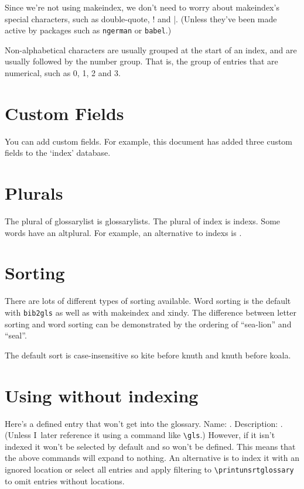 \documentclass{book}
\newcommand*{\appname}[1]{\texttt{#1}}
\begin{document}
Since we're not using \gls{makeindex}, we don't need to worry about
\gls{makeindex}'s special characters, such as \gls{double-quote}, \gls{!} and
\gls{|}. (Unless they've been made active by packages such as
\texttt{ngerman} or \texttt{babel}.)

Non-alphabetical characters are usually grouped at the start of an
index, and are usually followed by the number group. That is, the
group of entries that are numerical, such as \gls{0}, \gls{1},
\gls{2} and \gls{3}.

\section{Custom Fields}

You can add custom fields. For example, this document has added
three custom fields to the `index' database.

\section{Plurals}

The \gls{plural} of \gls{glossarylist} is
\glspl{glossarylist}. The \gls{plural} of \gls{index} is
\glspl{index}. Some words have an \gls{altplural}. For example,
an alternative to \glspl{index} is 
.%

\section{Sorting}

There are lots of different types of sorting available. 
Word sorting is the default with \appname{bib2gls} as well as with
\gls{makeindex} and \gls{xindy}.
The difference between letter sorting and word sorting can
be demonstrated by the ordering of ``\gls{sea-lion}'' and ``\gls{seal}''.

The default sort is case-insensitive so \gls{kite} before
\gls{knuth} and \gls{knuth} before \gls{koala}.

\section{Using without indexing}

Here's a defined entry that won't get into the glossary.
Name: .
Description: .
(Unless I~later reference it using a command like \verb|\gls|.)
However, if it isn't indexed it won't be selected by default and so
won't be defined. This means that the above commands will expand to
nothing. An alternative is to index it with an ignored location or
select all entries and apply filtering to \verb|\printunsrtglossary|
to omit entries without locations.
\end{document}
